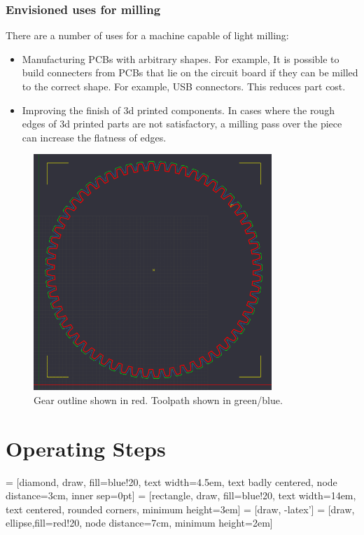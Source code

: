 \documentclass[a4paper,11pt]{article}  %
\begin{document}
\subsubsection {Envisioned uses for milling}
{
There are a number of uses for a machine capable of light milling:

\begin{itemize} \itemsep0em
	\item	Manufacturing PCBs with arbitrary shapes. For example, It is possible to build connecters from PCBs that lie on the circuit board if they can be milled to the correct shape.
			For example, USB connectors. This reduces part cost.
	\item	Improving the finish of 3d printed components. In cases where the rough edges of 3d printed parts are not satisfactory, a milling pass over the piece can increase the flatness
			of edges.
	
\end{itemize}
}

\begin{figure}[ht!]
\centering
\includegraphics[width=90mm]{resources/gear_cambam.png}
\caption{Gear outline shown in red. Toolpath shown in green/blue.}
\label{overflow}
\end{figure}

\section{Operating Steps}

 = [diamond, draw, fill=blue!20, 
    text width=4.5em, text badly centered, node distance=3cm, inner sep=0pt]
 = [rectangle, draw, fill=blue!20, 
    text width=14em, text centered, rounded corners, minimum height=3em]
 = [draw, -latex']
 = [draw, ellipse,fill=red!20, node distance=7cm,
    minimum height=2em]
    
\end{document}

